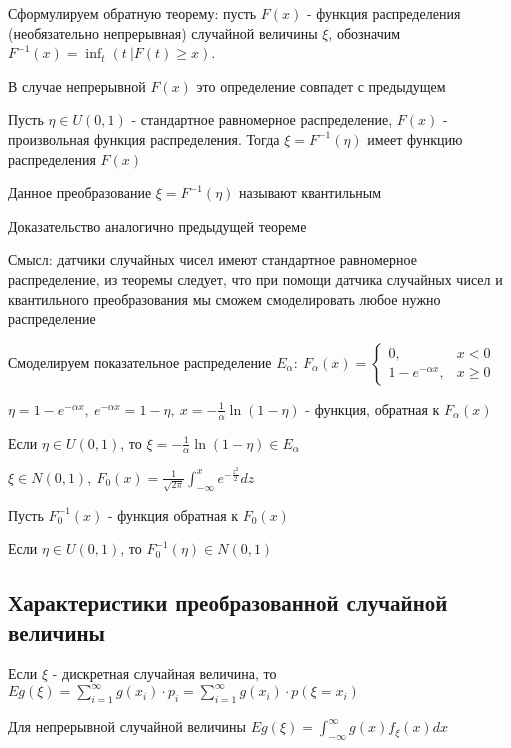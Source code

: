 \documentclass[12pt]{article}
\begin{document}
    Сформулируем обратную теорему: пусть $F(x)$ - функция распределения (необязательно непрерывная) случайной величины $\xi$,
    обозначим $F^{-1}(x) = \inf_t (t \ | F(t) \geq x)$.

    В случае непрерывной $F(x)$ это определение совпадет с предыдущем

    \begin{MyTheorem}
         Пусть $\eta \in U(0, 1)$ - стандартное равномерное распределение, $F(x)$ - произвольная функция распределения. 
        Тогда $\xi = F^{-1}(\eta)$ имеет функцию распределения $F(x)$
    \end{MyTheorem}

    Данное преобразование $\xi = F^{-1}(\eta)$ называют квантильным

    Доказательство аналогично предыдущей теореме
    
    Смысл: датчики случайных чисел имеют стандартное равномерное распределение, из теоремы следует, что при помощи
    датчика случайных чисел и квантильного преобразования мы сможем смоделировать любое нужно распределение

     Смоделируем показательное распределение $E_\alpha: \ F_\alpha(x) = \begin{cases}0, & x < 0 \\ 1 - e^{-\alpha x}, & x \geq 0\end{cases}$

    $\eta = 1 - e^{-\alpha x}, \ e^{-\alpha x} = 1 - \eta, \ x = -\frac{1}{\alpha} \ln(1 - \eta)$ - функция, обратная к $F_\alpha(x)$

    Если $\eta \in U(0, 1)$, то $\xi = -\frac{1}{\alpha} \ln(1 - \eta) \in E_\alpha$

     $\xi \in N(0, 1), \ F_0(x) = \frac{1}{\sqrt{2\pi}} \int_{-\infty}^x e^{-\frac{z^2}{2}} dz$

    Пусть $F_0^{-1}(x)$ - функция обратная к $F_0(x)$

    Если $\eta \in U(0, 1)$, то $F_0^{-1}(\eta) \in N(0, 1)$

    \subsection{Характеристики преобразованной случайной величины}

    \hypertarget{expectedvalueoftransformedvariable}{}

    \begin{MyTheorem}
        \Ths Если $\xi$ - дискретная случайная величина, то $Eg(\xi) = \sum_{i = 1}^\infty g(x_i) \cdot p_i = \sum_{i = 1}^\infty g(x_i) \cdot p(\xi = x_i)$

        Для непрерывной случайной величины $Eg(\xi) = \int_{-\infty}^{\infty} g(x) f_\xi(x) dx$
    \end{MyTheorem}
\end{document}
